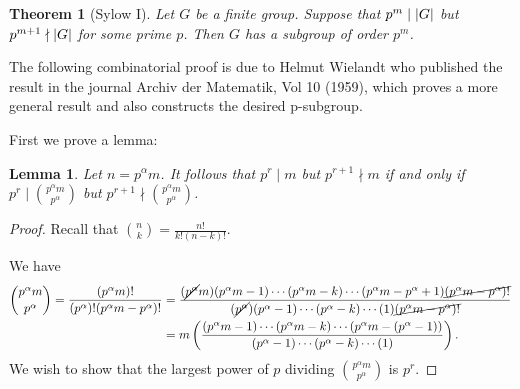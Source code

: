 \documentclass[11pt]{article}
\newcommand{\br}[1]{\left(#1\right)}
\newtheorem*{theorem}{Theorem}
\newtheorem*{lemma}{Lemma}
\begin{document}
\begin{theorem}[Sylow I]
    Let $G$ be a finite group. Suppose that $p^m\mid \abs{G}$ but $p^{m+1}\nmid \abs{G}$ for some prime $p$. Then $G$ has a subgroup of order $p^m$.
\end{theorem}
The following combinatorial proof is due to Helmut Wielandt who published the result in the journal Archiv der Matematik, Vol 10 (1959), which proves a more general result and also constructs the desired p-subgroup.

First we prove a lemma:
\begin{lemma}
    Let $n = p^\alpha m$. It follows that $p^r\mid m$ but $p^{r+1}\nmid m$ if and only if $p^r\mid \binom{p^\alpha m}{p^\alpha}$ but $p^{r+1}\nmid \binom{p^\alpha m}{p^\alpha}$.
\end{lemma}
\begin{proof}
    Recall that $\binom{n}{k} = \frac{n!}{k!(n-k)!}$.
    
    We have \begin{align*}
        \binom{p^\alpha m}{p^\alpha} = \frac{(p^\alpha m)!}{(p^\alpha)!(p^\alpha m - p^\alpha)!} &= \frac{(\cancel{p^\alpha}m)(p^\alpha m - 1)\cdots (p^\alpha m - k)\cdots (p^\alpha m - p^\alpha + 1) \cancel{(p^\alpha m - p^\alpha)!}}{(\cancel{p^\alpha})(p^\alpha - 1)\cdots (p^\alpha - k) \cdots (1)\cancel{(p^\alpha m - p^\alpha)!}}\\
        &= m\br{\frac{(p^\alpha m - 1)\cdots (p^\alpha m - k)\cdots (p^\alpha m - (p^\alpha - 1))}{(p^\alpha - 1)\cdots (p^\alpha - k) \cdots (1)}}.
    \end{align*}  We wish to show that the largest power of $p$ dividing $\binom{p^\alpha m}{p^\alpha}$ is $p^r$.


\end{proof}
\end{document}
